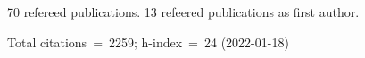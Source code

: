 70 refereed publications. 13 refeered publications as first author.

Total citations~=~2259; h-index~=~24 (2022-01-18)